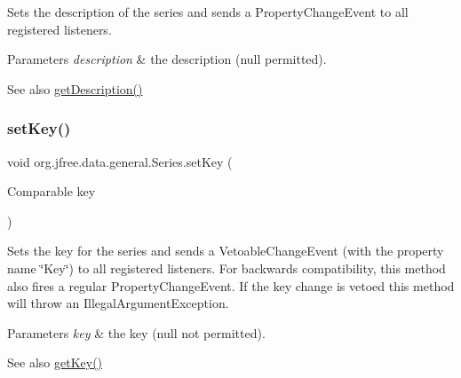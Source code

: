 Sets the description of the series and sends a {\ttfamily Property\+Change\+Event} to all registered listeners.


\begin{DoxyParams}{Parameters}
{\em description} & the description ({\ttfamily null} permitted).\\
\hline
\end{DoxyParams}
\begin{DoxySeeAlso}{See also}
\mbox{\hyperlink{classorg_1_1jfree_1_1data_1_1general_1_1_series_a903888e10e128bb6e7d139110c0e6619}{get\+Description()}} 
\end{DoxySeeAlso}
\mbox{\label{classorg_1_1jfree_1_1data_1_1general_1_1_series_a9d5a4915a30d62fc59dbfc351efdf24e}} 
\subsubsection{\texorpdfstring{set\+Key()}{setKey()}}
{\footnotesize\ttfamily void org.\+jfree.\+data.\+general.\+Series.\+set\+Key (\begin{DoxyParamCaption}\item[{Comparable}]{key }\end{DoxyParamCaption})}

Sets the key for the series and sends a {\ttfamily Vetoable\+Change\+Event} (with the property name \char`\"{}\+Key\char`\"{}) to all registered listeners. For backwards compatibility, this method also fires a regular {\ttfamily Property\+Change\+Event}. If the key change is vetoed this method will throw an Illegal\+Argument\+Exception.


\begin{DoxyParams}{Parameters}
{\em key} & the key ({\ttfamily null} not permitted).\\
\hline
\end{DoxyParams}
\begin{DoxySeeAlso}{See also}
\mbox{\hyperlink{classorg_1_1jfree_1_1data_1_1general_1_1_series_a3cc77859046ad99ea9f01aea606f8165}{get\+Key()}} 
\end{DoxySeeAlso}
\mbox{\label{classorg_1_1jfree_1_1data_1_1general_1_1_series_a3d1c8936672fc710b1ae7c56751230b6}} 
